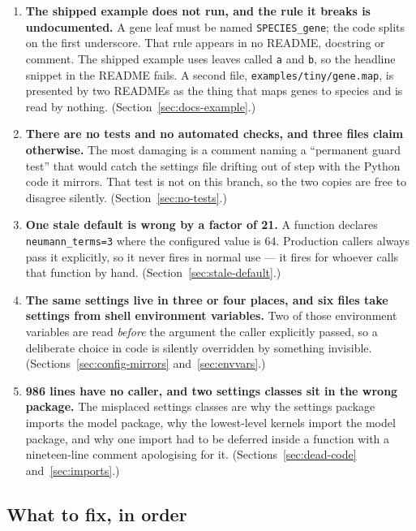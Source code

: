 \documentclass[11pt]{article}
\newcommand{\dir}[1]{\nolinkurl{#1}}
\begin{document}
\begin{enumerate}
  \item \textbf{The shipped example does not run, and the rule it breaks is
        undocumented.}  A gene leaf must be named \texttt{SPECIES\_gene}; the
        code splits on the first underscore.  That rule appears in no README,
        docstring or comment.  The shipped example uses leaves called
        \texttt{a} and \texttt{b}, so the headline snippet in the README fails.
        A second file, \dir{examples/tiny/gene.map}, is presented by two
        READMEs as the thing that maps genes to species and is read by nothing.
        (Section~\ref{sec:docs-example}.)
  \item \textbf{There are no tests and no automated checks, and three files
        claim otherwise.}  The most damaging is a comment naming a ``permanent
        guard test'' that would catch the settings file drifting out of step
        with the Python code it mirrors.  That test is not on this branch, so
        the two copies are free to disagree silently.
        (Section~\ref{sec:no-tests}.)
  \item \textbf{One stale default is wrong by a factor of 21.}  A function
        declares \texttt{neumann\_terms=3} where the configured value is 64.
        Production callers always pass it explicitly, so it never fires in
        normal use --- it fires for whoever calls that function by hand.
        (Section~\ref{sec:stale-default}.)
  \item \textbf{The same settings live in three or four places, and six files
        take settings from shell environment variables.}  Two of those
        environment variables are read \emph{before} the argument the caller
        explicitly passed, so a deliberate choice in code is silently
        overridden by something invisible.  (Sections~\ref{sec:config-mirrors}
        and~\ref{sec:envvars}.)
  \item \textbf{986 lines have no caller, and two settings classes sit in the
        wrong package.}  The misplaced settings classes are why the settings
        package imports the model package, why the lowest-level kernels import
        the model package, and why one import had to be deferred inside a
        function with a nineteen-line comment apologising for it.
        (Sections~\ref{sec:dead-code} and~\ref{sec:imports}.)
\end{enumerate}

\subsection*{What to fix, in order}
\end{document}
